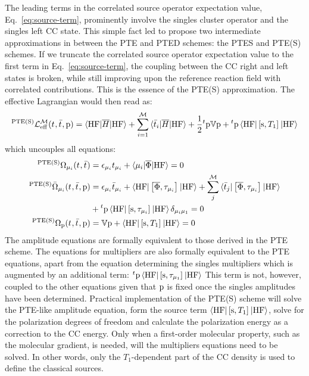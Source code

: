 The leading terms in the correlated source operator expectation
value, Eq.~\eqref{eq:source-term}, prominently involve the singles
cluster operator and the singles left \acs{CC} state.
This simple fact led \citeauthor{Caricato2011-tx} to propose two
intermediate approximations in between the \acs{PTE} and \acs{PTED}
schemes: the \acs{PTES} and \acs{PTE(S)} schemes.
If we truncate the correlated source operator expectation value
to the first term in Eq.~\eqref{eq:source-term}, the coupling between
the \acs{CC} right and left states is broken, while still improving upon the
reference reaction field with correlated contributions.
This is the essence of the \acs{PTE(S)} approximation. The effective
Lagrangian would then read as:
\begin{equation}\label{eq:ptes-cc}
  {}^{\mathrm{PTE(S)}}\mathcal{L}^\mathcal{M}_\mathrm{eff}(t_{}, \bar{t}_{}, \mathrm{p}) =
  \braket{\mathrm{HF} | \overline{H} | \mathrm{HF}}
  + \sum_{i=1}^{\mathcal{M}}\braket{\bar{t}_{i} | \overline{H} | \mathrm{HF}}
  + \frac{1}{2}{}^t\mathrm{p}\mathbb{V}\mathrm{p} + {}^t\mathrm{p}
  \braket{\mathrm{HF} | \left[ \mathrm{s}, T_1 \right]^{} | \mathrm{HF}}
\end{equation}
which uncouples all equations:
\begin{subequations}
  \begin{align}
  {}^{\mathrm{PTE(S)}}\Omega_{\mu_i}(t_{}, \bar{t}_{})  &=
   \epsilon_{\mu_i}t_{\mu_i} + \braket{\mu_i | \overline{\Phi} | \mathrm{HF}}
   = 0 \\
   {}^{\mathrm{PTE(S)}}\bar{\Omega}_{\mu_i}(t_{}, \bar{t}_{}, \mathrm{p}) &=
    \epsilon_{\mu_i}\bar{t}_{\mu_i} +
    \braket{\mathrm{HF} | \left[ \overline{\Phi}, \tau_{\mu_i} \right]^{} | \mathrm{HF}} +
    \sum_{j}^{\mathcal{M}}\braket{\bar{t}_{j} |
    \left[ \overline{\Phi}, \tau_{\mu_i} \right]^{} | \mathrm{HF}}
    \nonumber \\
    &+
    {}^t\mathrm{p}\braket{\mathrm{HF} | \left[ \mathrm{s}, \tau_{\mu_i} \right]^{} | \mathrm{HF}}\delta_{\mu_i\mu_1}
    = 0 \\
    {}^{\mathrm{PTE(S)}}\Omega_{\mathrm{p}}(t_{}, \bar{t}_{}, \mathrm{p})
    &=
    \mathbb{V}\mathrm{p} + \braket{\mathrm{HF} | \left[ \mathrm{s}, T_1 \right]^{} | \mathrm{HF}} = 0
  \end{align}
\end{subequations}
The amplitude equations are formally equivalent to those derived in the
\acs{PTE} scheme. The equations for multipliers are also formally
equivalent to the \acs{PTE} equations, apart from the equation
determining the singles multipliers which is augmented by an additional term:
${}^t\mathrm{p}\braket{\mathrm{HF} | \left[ \mathrm{s}, \tau_{\mu_1} \right]^{} |
\mathrm{HF}}$
This term is not, however, coupled to the other equations given that
$\mathrm{p}$ is fixed once the singles amplitudes have been determined.
Practical implementation of the \acs{PTE(S)} scheme will solve the
\acs{PTE}-like amplitude equation, form the source term
$\braket{\mathrm{HF} | \left[ \mathrm{s}, T_1 \right]^{} | \mathrm{HF}}$, solve for
the polarization degrees of freedom and calculate the polarization
energy as a correction to the \acs{CC} energy.
Only when a first-order molecular property, such as the molecular
gradient, is needed, will the multipliers equations need to be solved.
In other words, only the $T_1$-dependent part of the \acs{CC} density is
used to define the classical sources.


